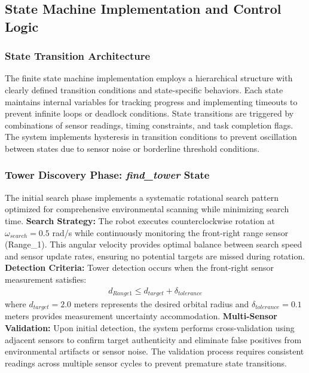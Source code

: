 \subsection{State Machine Implementation and Control Logic}
\subsubsection{State Transition Architecture}
The finite state machine implementation employs a hierarchical structure with clearly defined transition conditions and state-specific behaviors. Each state maintains internal variables for tracking progress and implementing timeouts to prevent infinite loops or deadlock conditions.
State transitions are triggered by combinations of sensor readings, timing constraints, and task completion flags. The system implements hysteresis in transition conditions to prevent oscillation between states due to sensor noise or borderline threshold conditions.
\subsubsection{Tower Discovery Phase: \textit{find\_tower} State}
The initial search phase implements a systematic rotational search pattern optimized for comprehensive environmental scanning while minimizing search time.
\textbf{Search Strategy:}
The robot executes counterclockwise rotation at $\omega_{search} = 0.5$ rad/s while continuously monitoring the front-right range sensor (Range\_1). This angular velocity provides optimal balance between search speed and sensor update rates, ensuring no potential targets are missed during rotation.
\textbf{Detection Criteria:}
Tower detection occurs when the front-right sensor measurement satisfies:
\begin{align}
d_{Range1} \leq d_{target} + \delta_{tolerance}
\end{align}
where $d_{target} = 2.0$ meters represents the desired orbital radius and $\delta_{tolerance} = 0.1$ meters provides measurement uncertainty accommodation.
\textbf{Multi-Sensor Validation:}
Upon initial detection, the system performs cross-validation using adjacent sensors to confirm target authenticity and eliminate false positives from environmental artifacts or sensor noise. The validation process requires consistent readings across multiple sensor cycles to prevent premature state transitions.
